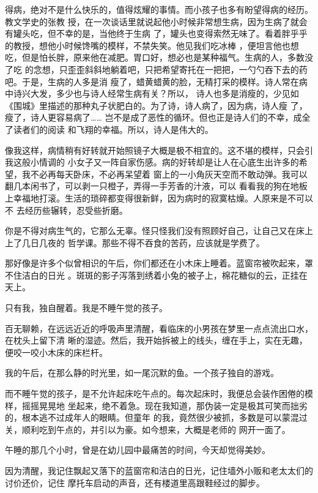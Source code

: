 \documentclass[12pt,a4paper]{article}
\begin{document}
		得病，绝对不是什么快乐的，值得炫耀的事情。而小孩子也多有盼望得病的经历。教文学史的张教
	授，在一次谈话里就说起他小时候非常想生病，因为生病了就会有罐头吃，但不幸的是，当他终于生病
	了，罐头也变得索然无味了。看着胖乎乎的教授，想他小时候馋嘴的模样，不禁失笑。他见我们吃冰棒
	，便坦言他也想吃，但是怕长胖，原来他在减肥。胃口好，想必也是某种福气。生病的人，多数没了吃
	的念想，只歪歪斜斜地躺着吧，只把希望寄托在一把把，一勺勺吞下去的药吧。于是，生病的人多是消
	瘦了，蜡黄蜡黄的脸，无精打采的模样。诗人常在病中诗兴大发，多少也与诗人经常生病有关？所以，
	诗人也多是消瘦的，少见如《围城》里描述的那种丸子状肥白的。为了诗，诗人病了，因为病，诗人瘦
	了，瘦了，诗人更容易病了…… 岂不是成了恶性的循环。但也正是诗人们的不幸，成全了读者们的阅读
	和飞翔的幸福。所以，诗人是伟大的。


		像我这样，病情稍有好转就开始照镜子大概是极不相宜的。这不堪的模样，只会引我这般小情调的
	小女子又一阵自家伤感。病的好转却是让人在心底生出许多的希望，我不必再每天卧床，不必再呆望着
	窗上的一小角灰天空而不敢动弹。我可以翻几本闲书了，可以剥一只橙子，弄得一手芳香的汁液，可以
	看看我的狗在地板上幸福地打滚。生活的琐碎都变得很新鲜，因为病时的寂寞枯燥。人原来是不可以不
	去经历些辗转，忍受些折磨。


		你是不得对病生气的，它那么无辜。怪只怪我们没有照顾好自己，让自己又在床上上了几日几夜的
	哲学课。那些不得不吞食的苦药，应该就是学费了。

	\endwriting



		那好像是许多个似曾相识的午后，你们都还在小木床上睡着。蓝窗帘被吹起来，罩不住洁白的日光
	。斑斑的影子泻落到绣着小兔的被子上，棉花糖似的云，正挂在天上。

		只有我，独自醒着。我是不睡午觉的孩子。

		百无聊赖，在远远近近的呼吸声里清醒，看临床的小男孩在梦里一点点流出口水，在枕头上留下清
	晰的湿迹。然后，我开始拆被上的线头，缠在手上，实在无趣，便咬一咬小木床的床栏杆。

		我的午后，在那么静的时光里，如一尾沉默的鱼。一个孩子独自的游戏。

		而不睡午觉的孩子，是不允许起床吃午点的。每次起床时，我便总会装作困倦的模样，摇摇晃晃地
	坐起来，绝不着急。现在我知道，那伪装一定是极其可笑而拙劣的，根本逃不过成年人的眼睛。但童年
	的我，竟然很少被抓，多数是可以蒙混过关，顺利吃到午点的，并引以为豪。如今想来，大概是老师的
	网开一面了。

		午睡的那几个小时，曾是在幼儿园中最痛苦的时间，今天却觉得美妙。

		因为清醒，我记住飘起又落下的蓝窗帘和洁白的日光，记住墙外小贩和老太太们的讨价还价，记住
	摩托车启动的声音，还有楼道里高跟鞋经过的脚步。
\end{document}

